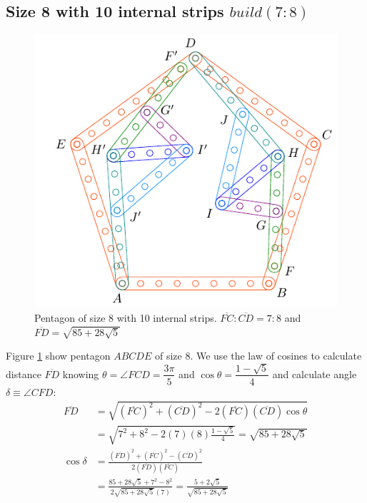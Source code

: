 \documentclass[11pt]{article}
\begin{document}
\subsection{Size 8 with 10 internal strips $build(7:8)$}

\begin{figure}[H]
\centering
\includegraphics[scale=1.1]{8/penta8-10b}
\caption{Pentagon of size 8 with 10 internal strips. $\overline{FC}:\overline{CD} = 7:8$ and $\overline{FD} = \sqrt{85 + 28\sqrt5}$}
\label{fig:penta8-10b}
\end{figure}

Figure \ref{fig:penta8-10b} show pentagon $ABCDE$ of size $8$. We use the law of cosines to calculate distance $\overline{FD}$ knowing $\theta = \angle{FCD} = \dfrac{3\pi}5$ and $\cos\theta = \dfrac{1-\sqrt5}4$ and calculate angle $\delta \equiv \angle{CFD}$:
\begin{align}
\overline{FD} &= \sqrt{(\overline{FC})^2 + (\overline{CD})^2
 - 2(\overline{FC})(\overline{CD})\cos\theta} \nonumber\\
 &= \sqrt{7^2 + 8^2 - 2(7)(8)\frac{1-\sqrt5}4} = \sqrt{85 + 28\sqrt5} \\
\cos\delta &= \frac{(\overline{FD})^2 + (\overline{FC})^2 - (\overline{CD})^2}
 {2(\overline{FD})(\overline{FC})} \nonumber\\
 &= \frac{85 + 28\sqrt5 + 7^2 - 8^2}{2\sqrt{85 + 28\sqrt5}(7)}
 = \frac{5 + 2\sqrt5}{\sqrt{85 + 28\sqrt5}}
\end{align}
\end{document}
